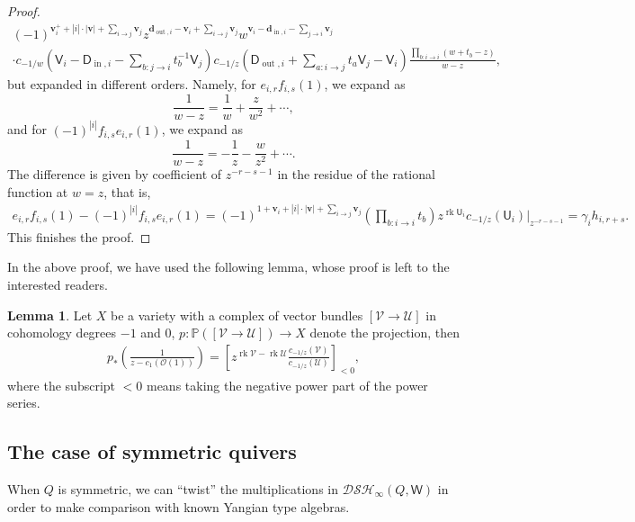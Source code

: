 \documentclass[10pt]{amsart}
\theoremstyle{definition}
\newtheorem{Lemma}[Theorem]{Lemma}
\numberwithin{equation}{section}
\newcommand{\bP}{\mathbb{P}}
\newcommand{\bv}{\mathbf{v}}
\newcommand{\bd}{\mathbf{d}}
\newcommand{\sW}{\mathsf{W}}
\newcommand{\rk}{\operatorname{rk}}
\newcommand{\In}{\operatorname{in}}
\newcommand{\Out}{\operatorname{out}}
\begin{document}
\begin{proof}
\begin{multline*}
(-1)^{\bv^+_i+|i|\cdot |\bv|+\sum_{i\to j}\bv_j}z^{\bd_{\Out,i}-\bv_i +\sum_{i\to j}\bv_j}w^{\bv_i -\bd_{\In,i}-\sum_{j\to i}\bv_j}\\
\cdot c_{-1/w}\left(\mathsf V_i -\mathsf D_{\In,i}-\sum_{b:j\to i}t_b^{-1}\mathsf V_j\right)c_{-1/z}\left(\mathsf D_{\Out,i}+\sum_{a:i\to j}t_a\mathsf V_j-\mathsf V_i\right)\frac{\prod_{b:i\to i}(w+t_b-z)}{w-z}, 
\end{multline*}
but expanded in different orders. Namely, for $e_{i,r}f_{i,s}(1)$, we expand as 
$$\frac{1}{w-z}=\frac{1}{w}+\frac{z}{w^2}+\cdots, $$
and for $(-1)^{|i|}f_{i,s}e_{i,r}(1)$, we expand as 
$$\frac{1}{w-z}=-\frac{1}{z}-\frac{w}{z^2}+\cdots. $$ 
The difference is given by coefficient of $z^{-r-s-1}$ in the residue of the rational function at $w=z$, that is,
\begin{align*}
e_{i,r}f_{i,s}(1)-(-1)^{|i|}f_{i,s}e_{i,r}(1)=
(-1)^{1+\bv_i+|i|\cdot |\bv|+\sum_{i\to j}\bv_j}\left(\prod_{b:i\to i}t_b\right)z^{\rk\mathsf U_i}c_{-1/z}\left(\mathsf U_i\right)\Bigg|_{z^{-r-s-1}}=\gamma_i h_{i,r+s}.
\end{align*}
This finishes the proof.
\end{proof}
In the above proof, we have used the following lemma, whose proof is left to the interested readers. 
\begin{Lemma}\label{lem segre}
Let $X$ be a variety with a complex of vector bundles $[\mathcal V\to \mathcal U]$ in cohomology degrees $-1$ and $0$, $p\colon \bP([\mathcal V\to \mathcal U])\to X$ denote the projection, then 
\begin{align*}
    p_*\left(\frac{1}{z-c_1(\mathcal O(1))}\right)=\left[z^{\rk\mathcal V-\rk\mathcal U}\frac{c_{-1/z}(\mathcal V)}{c_{-1/z}(\mathcal U)}\right]_{<0},
\end{align*}
where the subscript $<0$ means taking the negative power part of the power series.
\end{Lemma}


\subsection{The case of symmetric quivers}\label{sec shifted yangian_sym quiver}

When $Q$ is symmetric, we can ``twist'' the multiplications in $\mathcal{DSH}_\infty(Q,\sW)$ in order to make comparison with known Yangian type algebras. 
\end{document}
